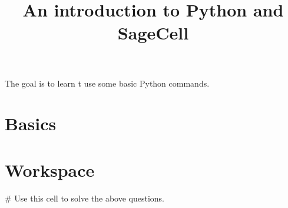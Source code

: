\documentclass{ximera}
\title{An introduction to Python and SageCell}
\begin{document}
The goal is to learn t use some basic Python commands.
\begin{abstract}  
\end{abstract}  
\maketitle

\section{Basics}



\section{Workspace}

\begin{sageCell}
# Use this cell to solve the above questions.
\end{sageCell}
\end{document}
